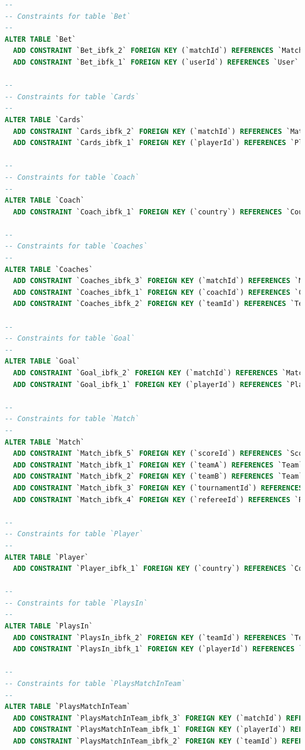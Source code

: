 \documentclass[11pt]{article}
\begin{document}
    \begin{framed}
    \begin{lstlisting}[language=sql]
--
-- Constraints for table `Bet`
--
ALTER TABLE `Bet`
  ADD CONSTRAINT `Bet_ibfk_2` FOREIGN KEY (`matchId`) REFERENCES `Match` (`id`),
  ADD CONSTRAINT `Bet_ibfk_1` FOREIGN KEY (`userId`) REFERENCES `User` (`id`);

--
-- Constraints for table `Cards`
--
ALTER TABLE `Cards`
  ADD CONSTRAINT `Cards_ibfk_2` FOREIGN KEY (`matchId`) REFERENCES `Match` (`id`),
  ADD CONSTRAINT `Cards_ibfk_1` FOREIGN KEY (`playerId`) REFERENCES `Player` (`id`);

--
-- Constraints for table `Coach`
--
ALTER TABLE `Coach`
  ADD CONSTRAINT `Coach_ibfk_1` FOREIGN KEY (`country`) REFERENCES `Country` (`id`);

--
-- Constraints for table `Coaches`
--
ALTER TABLE `Coaches`
  ADD CONSTRAINT `Coaches_ibfk_3` FOREIGN KEY (`matchId`) REFERENCES `Match` (`id`),
  ADD CONSTRAINT `Coaches_ibfk_1` FOREIGN KEY (`coachId`) REFERENCES `Coach` (`id`),
  ADD CONSTRAINT `Coaches_ibfk_2` FOREIGN KEY (`teamId`) REFERENCES `Team` (`id`);

--
-- Constraints for table `Goal`
--
ALTER TABLE `Goal`
  ADD CONSTRAINT `Goal_ibfk_2` FOREIGN KEY (`matchId`) REFERENCES `Match` (`id`),
  ADD CONSTRAINT `Goal_ibfk_1` FOREIGN KEY (`playerId`) REFERENCES `Player` (`id`);

--
-- Constraints for table `Match`
--
ALTER TABLE `Match`
  ADD CONSTRAINT `Match_ibfk_5` FOREIGN KEY (`scoreId`) REFERENCES `Score` (`id`),
  ADD CONSTRAINT `Match_ibfk_1` FOREIGN KEY (`teamA`) REFERENCES `Team` (`id`),
  ADD CONSTRAINT `Match_ibfk_2` FOREIGN KEY (`teamB`) REFERENCES `Team` (`id`),
  ADD CONSTRAINT `Match_ibfk_3` FOREIGN KEY (`tournamentId`) REFERENCES `Tournament` (`id`),
  ADD CONSTRAINT `Match_ibfk_4` FOREIGN KEY (`refereeId`) REFERENCES `Referee` (`id`);

--
-- Constraints for table `Player`
--
ALTER TABLE `Player`
  ADD CONSTRAINT `Player_ibfk_1` FOREIGN KEY (`country`) REFERENCES `Country` (`id`);

--
-- Constraints for table `PlaysIn`
--
ALTER TABLE `PlaysIn`
  ADD CONSTRAINT `PlaysIn_ibfk_2` FOREIGN KEY (`teamId`) REFERENCES `Team` (`id`),
  ADD CONSTRAINT `PlaysIn_ibfk_1` FOREIGN KEY (`playerId`) REFERENCES `Player` (`id`);

--
-- Constraints for table `PlaysMatchInTeam`
--
ALTER TABLE `PlaysMatchInTeam`
  ADD CONSTRAINT `PlaysMatchInTeam_ibfk_3` FOREIGN KEY (`matchId`) REFERENCES `Match` (`id`),
  ADD CONSTRAINT `PlaysMatchInTeam_ibfk_1` FOREIGN KEY (`playerId`) REFERENCES `Player` (`id`),
  ADD CONSTRAINT `PlaysMatchInTeam_ibfk_2` FOREIGN KEY (`teamId`) REFERENCES `Team` (`id`);


\end{lstlisting}
\end{framed}
\end{document}
